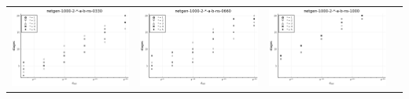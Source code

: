 \documentclass{article}
\begin{document}
\begin{landscape}
\begin{center}
\begin{longtable}{| c | c | c | c |}
\includegraphics[height=0.22\textheight]{hiter_fixlim_netgen-1000-2-_-a-b-ns-0330.png} &
\includegraphics[height=0.22\textheight]{hiter_fixlim_netgen-1000-2-_-a-b-ns-0660.png} &
\includegraphics[height=0.22\textheight]{hiter_fixlim_netgen-1000-2-_-a-b-ns-1000.png} \\

\end{longtable}
\end{center}
\end{landscape}
\end{document}
